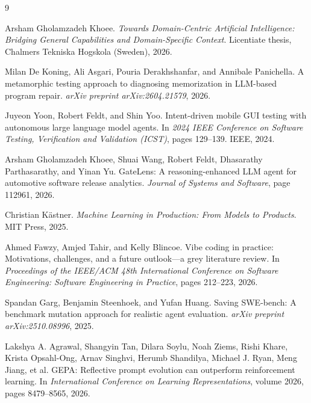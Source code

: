 \documentclass[11pt]{article}
\begin{document}
\begin{thebibliography}{9}

Arsham Gholamzadeh Khoee.
\newblock \emph{Towards Domain-Centric Artificial Intelligence: Bridging General Capabilities and Domain-Specific Context}.
\newblock Licentiate thesis, Chalmers Tekniska Hogskola (Sweden), 2026.

Milan De Koning, Ali Asgari, Pouria Derakhshanfar, and Annibale Panichella.
\newblock A metamorphic testing approach to diagnosing memorization in LLM-based program repair.
\newblock \emph{arXiv preprint arXiv:2604.21579}, 2026.

Juyeon Yoon, Robert Feldt, and Shin Yoo.
\newblock Intent-driven mobile GUI testing with autonomous large language model agents.
\newblock In \emph{2024 IEEE Conference on Software Testing, Verification and Validation (ICST)}, pages 129--139. IEEE, 2024.

Arsham Gholamzadeh Khoee, Shuai Wang, Robert Feldt, Dhasarathy Parthasarathy, and Yinan Yu.
\newblock GateLens: A reasoning-enhanced LLM agent for automotive software release analytics.
\newblock \emph{Journal of Systems and Software}, page 112961, 2026.

Christian K\"{a}stner.
\newblock \emph{Machine Learning in Production: From Models to Products}.
\newblock MIT Press, 2025.

Ahmed Fawzy, Amjed Tahir, and Kelly Blincoe.
\newblock Vibe coding in practice: Motivations, challenges, and a future outlook---a grey literature review.
\newblock In \emph{Proceedings of the IEEE/ACM 48th International Conference on Software Engineering: Software Engineering in Practice}, pages 212--223, 2026.

Spandan Garg, Benjamin Steenhoek, and Yufan Huang.
\newblock Saving SWE-bench: A benchmark mutation approach for realistic agent evaluation.
\newblock \emph{arXiv preprint arXiv:2510.08996}, 2025.

Lakshya A. Agrawal, Shangyin Tan, Dilara Soylu, Noah Ziems, Rishi Khare, Krista Opsahl-Ong, Arnav Singhvi, Herumb Shandilya, Michael J. Ryan, Meng Jiang, et al.
\newblock GEPA: Reflective prompt evolution can outperform reinforcement learning.
\newblock In \emph{International Conference on Learning Representations}, volume 2026, pages 8479--8565, 2026.

\end{thebibliography}
\end{document}
